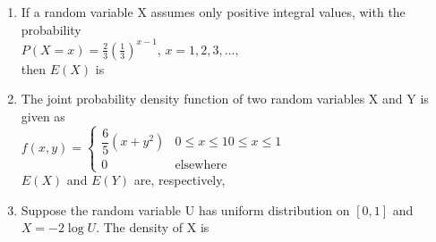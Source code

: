 \documentclass[journal,12pt,twocolumn]{IEEEtran}
\begin{document}
\begin{enumerate}
\item If a random variable X assumes only positive integral values, with the probability \\
$
P(X=x) = \frac{2}{3}(\frac{1}{3})^{x-1}$, $x=1,2,3,...,$ \\

then $E(X)$ is

\begin{enumerate}
\end{enumerate}
%
\solution



\item The joint probability density function of two random variables X and Y is given as \\
$
f(x,y)=
\begin{cases}
\dfrac{6}{5}(x+y^2)
& 0 \leqslant x \leqslant 1  0 \leqslant x \leqslant 1 \\
0 & \text{elsewhere}
\end{cases}
$\\
$E(X)$ and $E(Y)$ are, respectively,

\begin{enumerate}
\end{enumerate}
%
\solution


\item Suppose the random variable U has uniform distribution on $[0,1]$ and $X= -2 \log U$. The density of X is \\

\begin{enumerate}
\setlength\itemsep{2em}


\end{enumerate}
\end{enumerate}
\end{document}
